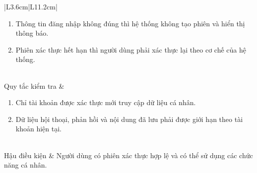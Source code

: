 \documentclass[12pt,a4paper,oneside]{report}
\begin{document}
{\begin{longtable}{|L{3.6cm}|L{11.2cm}|}
\begin{enumerate}[leftmargin=*,nosep]
                            \item Thông tin đăng nhập không đúng thì hệ thống không tạo phiên và hiển thị thông báo.
                            \item Phiên xác thực hết hạn thì người dùng phải xác thực lại theo cơ chế của hệ thống.
                          \end{enumerate}                        \\
    \hline
    Quy tắc kiểm tra    & \begin{enumerate}[leftmargin=*,nosep]
                            \item Chỉ tài khoản được xác thực mới truy cập dữ liệu cá nhân.
                            \item Dữ liệu hội thoại, phản hồi và nội dung đã lưu phải được giới hạn theo tài khoản hiện tại.
                          \end{enumerate}                \\
    \hline
    Hậu điều kiện       & Người dùng có phiên xác thực hợp lệ và có thể sử dụng các chức năng cá nhân.                                   \\
    \hline
  \end{longtable}
}
\end{document}
